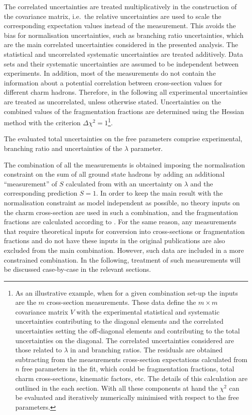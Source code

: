 The correlated uncertainties
are treated multiplicatively in the
construction of the covariance matrix, i.e.\ the relative uncertainties 
are used to scale the corresponding expectation values 
instead of the measurement.
%
This avoids the bias for normalisation uncertainties, such as branching 
ratio uncertainties, which are the main correlated uncertainties 
considered in the presented analysis.
%
The statistical and uncorrelated systematic uncertainties are treated 
additively.
%
Data sets and their systematic uncertainties are  assumed to be 
independent between experiments.
%
In addition, most of the measurements do not contain the information 
about a potential correlation between cross-section values for different 
charm hadrons.
%
Therefore, in the following all experimental uncertainties  are treated 
as uncorrelated, unless otherwise stated. Uncertainties on the combined 
values of the fragmentation fractions are determined using the Hessian 
method with the criterion $\Delta\chi^2=1$\footnote{
%
As an illustrative example, when
for a given combination set-up the inputs are the
$m$ cross-section measurements. 
%
These data define the $m \times m$ covariance matrix $V$ with the 
experimental statistical and systematic uncertainties contributing 
to the diagonal elements 
and the correlated uncertainties setting the off-diagonal elements 
and contributing to the total uncertainties on the diagonal.
%
The correlated uncertainties considered are those related to
$\lambda$ in  and branching ratios.
%
The residuals are obtained subtracting from the measurements 
cross-section expectations calculated from $n$ free parameters
in the fit, which could be fragmentation fractions, 
total charm cross-sections, kinematic factors, etc.
%
The details of this calculation are outlined in the each section.
%
With all these components at hand the $\chi^2$ can be evaluated 
and iteratively numerically minimised with respect to the 
free parameters.}.

%
The evaluated total uncertainties on the free parameters comprise 
experimental, branching ratio and  uncertainties of the $\lambda$ 
parameter.

The combination of all the measurements  is obtained imposing the 
normalisation constraint on the sum of all ground state hadrons by 
adding an additional ``measurement'' of $S$ calculated from 
 with an uncertainty on $\lambda$ and the  corresponding 
prediction $S = 1$.
%
In order to keep the main result with the normalisation constraint as 
model independent as possible, no theory inputs on the charm 
cross-section are used in  such  a combination, and the fragmentation 
fractions are calculated according to
  .
%
For the same reason, any measurements that require theoretical inputs 
for conversion into cross-sections or fragmentation fractions and do not 
have these inputs in the original publications are also excluded from 
the main combination.
%
However, such data are included in a more constrained 
combination.
%
In the following,  treatment of such measurements will be discussed 
case-by-case in the relevant sections.

